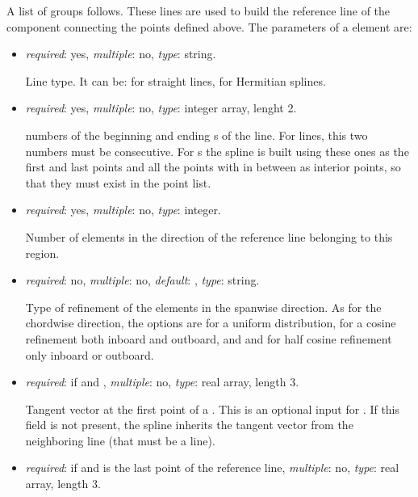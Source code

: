 %
A list of  groups follows. These lines are used to build the reference line of the component connecting the points defined above. The parameters of a  element are:
\begin{itemize}

\item {} \textit{required}: yes, \textit{multiple}: no, \textit{type}: string.

    Line type. It can be:  for straight lines,  for Hermitian splines.

\item {}  \textit{required}: yes, \textit{multiple}: no, \textit{type}: integer array, lenght 2.

     numbers of the beginning and ending s of the line. For  lines, this two numbers must be consecutive. For s the spline is built using these ones as the first and last points and all the points with  in between as interior points, so that they must exist in the point list.

\item {}  \textit{required}: yes, \textit{multiple}: no, \textit{type}: integer.

    Number of elements in the direction of the reference line belonging to this region.

\item {} \textit{required}: no, \textit{multiple}: no, \textit{default}: , \textit{type}: string.

    Type of refinement of the elements in the spanwise direction. As for the chordwise direction, the options are  for a uniform distribution,  for a cosine refinement both inboard and outboard, and  and  for half cosine refinement only inboard or outboard. 
  
\item {} \textit{required}: if  and , \textit{multiple}: no, \textit{type}: real array, length 3. 

    Tangent vector at the first point of a . This is an optional input for . If this field is not present, the spline inherits the tangent vector from the neighboring line (that must be a  line).

\item {} \textit{required}: if  and  is the last point of the reference line, \textit{multiple}: no, \textit{type}: real array, length 3. 


\end{itemize}
